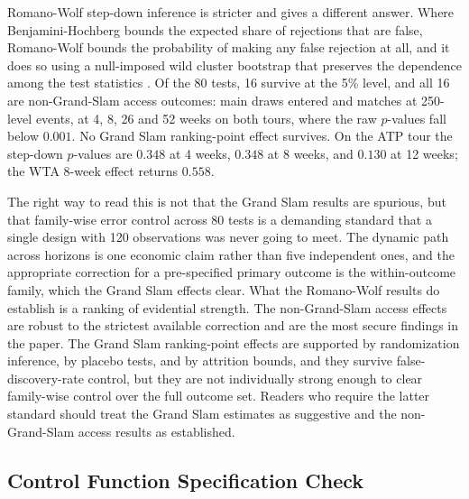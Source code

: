 Romano-Wolf step-down inference is stricter and gives a different answer. Where Benjamini-Hochberg bounds the expected share of rejections that are false, Romano-Wolf bounds the probability of making any false rejection at all, and it does so using a null-imposed wild cluster bootstrap that preserves the dependence among the test statistics \citep{RomanoWolf2005_stepdown, Clarke2020_romanowolf}. Of the 80 tests, 16 survive at the 5\% level, and all 16 are non-Grand-Slam access outcomes: main draws entered and matches at 250-level events, at 4, 8, 26 and 52 weeks on both tours, where the raw $p$-values fall below $0.001$. No Grand Slam ranking-point effect survives. On the ATP tour the step-down $p$-values are $0.348$ at 4 weeks, $0.348$ at 8 weeks, and $0.130$ at 12 weeks; the WTA 8-week effect returns $0.558$.

The right way to read this is not that the Grand Slam results are spurious, but that family-wise error control across 80 tests is a demanding standard that a single design with 120 observations was never going to meet. The dynamic path across horizons is one economic claim rather than five independent ones, and the appropriate correction for a pre-specified primary outcome is the within-outcome family, which the Grand Slam effects clear. What the Romano-Wolf results do establish is a ranking of evidential strength. The non-Grand-Slam access effects are robust to the strictest available correction and are the most secure findings in the paper. The Grand Slam ranking-point effects are supported by randomization inference, by placebo tests, and by attrition bounds, and they survive false-discovery-rate control, but they are not individually strong enough to clear family-wise control over the full outcome set. Readers who require the latter standard should treat the Grand Slam estimates as suggestive and the non-Grand-Slam access results as established.

\subsection{Control Function Specification Check}
\label{sec:robustness_cf}

